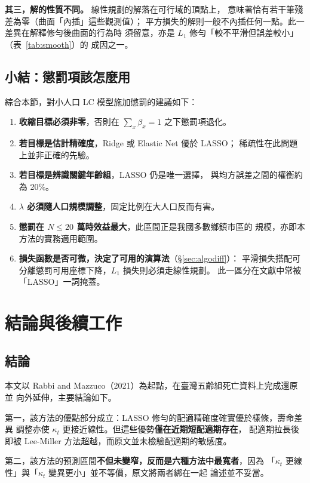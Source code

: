 \documentclass[UTF8, fontset=macnew, a4paper, 12pt]{ctexart}
\begin{document}
\textbf{其三，解的性質不同。} 線性規劃的解落在可行域的頂點上，
意味著恰有若干筆殘差為零（曲面「內插」這些觀測值）；
平方損失的解則一般不內插任何一點。此一差異在解釋修勻後曲面的行為時
須留意，亦是 $L_1$ 修勻「較不平滑但誤差較小」（表~\ref{tab:smooth}）的
成因之一。

\subsection{小結：懲罰項該怎麼用}

綜合本節，對小人口 LC 模型施加懲罰的建議如下：

\begin{enumerate}[leftmargin=*]
  \item \textbf{收縮目標必須非零}，否則在 $\sum_x\beta_x=1$ 之下懲罰項退化。
  \item \textbf{若目標是估計精確度}，Ridge 或 Elastic Net 優於 LASSO；
        稀疏性在此問題上並非正確的先驗。
  \item \textbf{若目標是辨識關鍵年齡組}，LASSO 仍是唯一選擇，
        與均方誤差之間的權衡約為 20\%。
  \item \textbf{$\lambda$ 必須隨人口規模調整}，固定比例在大人口反而有害。
  \item \textbf{懲罰在 $N\le20$ 萬時效益最大}，此區間正是我國多數鄉鎮市區的
        規模，亦即本方法的實務適用範圍。
  \item \textbf{損失函數是否可微，決定了可用的演算法}（\S\ref{sec:algodiff}）：
        平滑損失搭配可分離懲罰可用座標下降，$L_1$ 損失則必須走線性規劃。
        此一區分在文獻中常被「LASSO」一詞掩蓋。
\end{enumerate}

\section{結論與後續工作}

\subsection{結論}

本文以 Rabbi and Mazzuco（2021）為起點，在臺灣五齡組死亡資料上完成還原並
向外延伸，主要結論如下。

第一，該方法的優點部分成立：LASSO 修勻的配適精確度確實優於樣條，壽命差異
調整亦使 $\kappa_t$ 更接近線性。但這些優勢\textbf{僅在近期短配適期存在}，
配適期拉長後即被 Lee-Miller 方法超越，而原文並未檢驗配適期的敏感度。

第二，該方法的預測區間\textbf{不但未變窄，反而是六種方法中最寬者}，因為
「$\kappa_t$ 更線性」與「$\kappa_t$ 變異更小」並不等價，原文將兩者綁在一起
論述並不妥當。
\end{document}
